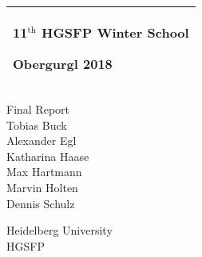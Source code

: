%
%
%
%
%
\begin{titlepage}
  \addtolength{\hoffset}{0.5\evensidemargin-0.5\oddsidemargin} %
  \noindent%
  \begin{tabular}{@{}p{\textwidth}@{}}
    \toprule[2pt]
    \midrule
    \vspace{0.2cm}
    \begin{center}
    \Huge{\textbf{
      11$^\text{th}$ HGSFP Winter School%
    }}
    \end{center}
    \begin{center}
      \Large{
        Obergurgl 2018%
      }
    \end{center}
    \vspace{0.2cm}\\
    \midrule
    \toprule[2pt]
  \end{tabular}
  \vspace{4 cm}
  \begin{center}
    {\large
      Final Report%
    }\\
    \vspace{0.2cm}
    {\Large
    	Tobias Buck \\
		Alexander Egl \\
		Katharina Haase \\
		Max Hartmann \\
		Marvin Holten \\
		Dennis Schulz \\
    }
  \end{center}
  \vfill
  \begin{center}
  Heidelberg University\\
  HGSFP
  \end{center}
\end{titlepage}
